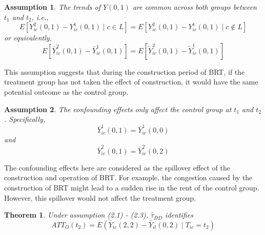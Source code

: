 \documentclass[12pt]{article}
\newtheorem{theorem}{Theorem}[section]
\newtheorem{assumption}{Assumption}[section]
\begin{document}
\begin{assumption}
The trends of $Y(0,1)$ are common across both groups between $t_1$ and $t_2$, i.e., 
\begin{equation}
    E[{Y}^{2}_{i c}(0,1) - {Y}^{1}_{i c}(0,1) \mid c \in L] = E[Y^{2}_{i c}(0,1) - {Y}^{1}_{i c}(0,1)  \mid c \not \in L]
\end{equation}
or equivalently, 
\begin{equation}
    E[\bar{Y}^{2}_{i c}(0,1) - \bar{Y}^{1}_{i c}(0,1)] = E[\tilde{Y}^{2}_{i c}(0,1) - \tilde{Y}^{1}_{i c}(0,1)]
\end{equation}
\end{assumption}

This assumption suggests that during the construction period of BRT, if the treatment group has not taken the effect of construction, it would have the same potential outcome as the control group.

\begin{assumption}
The confounding effects only affect the control group at $t_1$ and $t_2$. Specifically, 
\begin{equation}
    \bar{Y}^{1}_{i c}(0,1) = \bar{Y}^{1}_{i c}(0,0)
\end{equation}
and
\begin{equation}
    \bar{Y}^{2}_{i c}(0,1) = \bar{Y}^{2}_{i c}(0,2)
\end{equation}
\end{assumption}

The confounding effects here are considered as the spillover effect of the construction and operation of BRT. For example, the congestion caused by the construction of BRT might lead to a sudden rise in the rent of the control group. However, this spillover would not affect the treatment group.

\clearpage
\begin{theorem}
Under assumption (2.1) - (2.3), $\hat{\tau}_{D D}$ identifies 
\begin{equation}
    A T T_{O}(t_2)=E\left(\bar{Y}_{i c}(2,2)-\bar{Y}_{i l}(0,2) \mid T_{i c}=t_2\right)
\end{equation}
\end{theorem}
\end{document}
